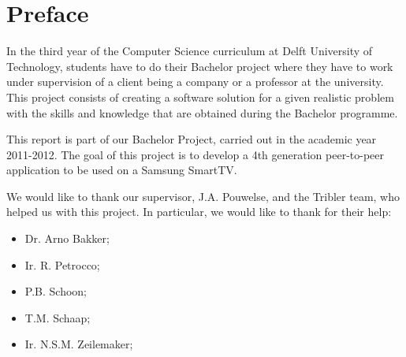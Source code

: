 \chapter*{Preface}
In the third year of the Computer Science curriculum at Delft University of Technology, students have to do their Bachelor project where they have to work under supervision of a client being a company or a professor at the university. This project consists of creating a software solution for a given realistic problem with the skills and knowledge that are obtained during the Bachelor programme.

This report is part of our Bachelor Project, carried out in the academic year 2011-2012. The goal of this project is to develop a 4th generation peer-to-peer application to be used on a Samsung SmartTV.

We would like to thank our supervisor, J.A. Pouwelse, and the Tribler team, who helped us with this project. In particular, we would like to thank for their help:

\begin{itemize}
\item Dr. Arno Bakker;
\item Ir. R. Petrocco;
\item P.B. Schoon;
\item T.M. Schaap;
\item Ir. N.S.M. Zeilemaker;

\end{itemize}
